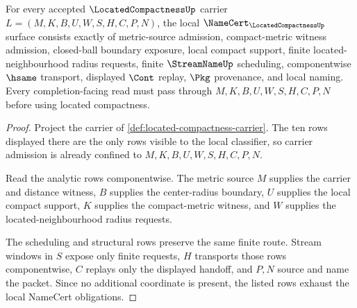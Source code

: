 \begin{theorem}
\label{thm:located-compactness-namecert-obligations}
For every accepted $\LocatedCompactnessUp$ carrier $L=(M,K,B,U,W,S,H,C,P,N)$, the local $\NameCert_{\LocatedCompactnessUp}$ surface consists exactly of metric-source admission, compact-metric witness admission, closed-ball boundary exposure, local compact support, finite located-neighbourhood radius requests, finite $\StreamNameUp$ scheduling, componentwise $\hsame$ transport, displayed $\Cont$ replay, $\Pkg$ provenance, and local naming. Every completion-facing read must pass through $M,K,B,U,W,S,H,C,P,N$ before using located compactness.
\end{theorem}
\begin{proof}
Project the carrier of \autoref{def:located-compactness-carrier}. The ten rows displayed there are the only rows visible to the local classifier, so carrier admission is already confined to $M,K,B,U,W,S,H,C,P,N$.

Read the analytic rows componentwise. The metric source $M$ supplies the carrier and distance witness, $B$ supplies the center-radius boundary, $U$ supplies the local compact support, $K$ supplies the compact-metric witness, and $W$ supplies the located-neighbourhood radius requests.

The scheduling and structural rows preserve the same finite route. Stream windows in $S$ expose only finite requests, $H$ transports those rows componentwise, $C$ replays only the displayed handoff, and $P,N$ source and name the packet. Since no additional coordinate is present, the listed rows exhaust the local NameCert obligations.
\end{proof}


